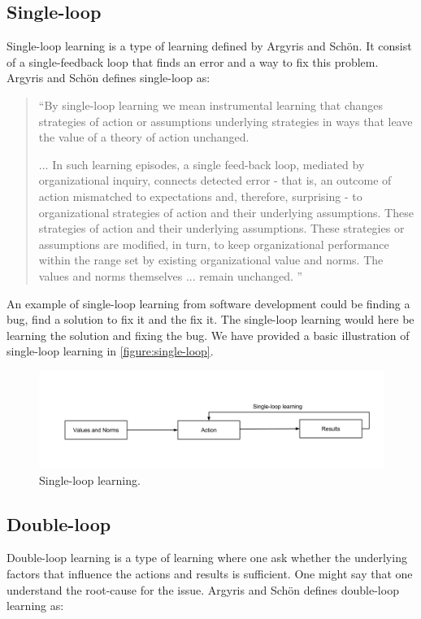 \subsection{Single-loop}
Single-loop learning is a type of learning defined by Argyris and Schön. It consist of a single-feedback loop that finds an error and a way to fix this problem. Argyris and Schön \cite{Argyris1996} defines single-loop as: 

\begin{quote}
``By single-loop learning we mean instrumental learning that changes strategies of action or assumptions underlying strategies in ways that leave the value of a theory of action unchanged.

... In such learning episodes, a single feed-back loop, mediated by organizational inquiry, connects detected error - that is, an outcome of action mismatched to expectations and, therefore, surprising - to organizational strategies of action and their underlying assumptions. These strategies of action and their underlying assumptions. These strategies or assumptions are modified, in turn, to keep organizational performance within the range set by existing organizational value and norms. The values and norms themselves ... remain unchanged. 
''
\end{quote}

An example of single-loop learning from software development could be finding a bug, find a solution to fix it and the fix it. The single-loop learning would here be learning the solution and fixing the bug. We have provided a basic illustration of single-loop learning in \autoref{figure:single-loop}.

\begin{figure}[!h]
	\centering
	\includegraphics[width=\textwidth, keepaspectratio]{figures/Single-loop.png}
	\caption{Single-loop learning.}
	\label{figure:single-loop}
\end{figure}

\subsection{Double-loop} %
\label{sub:double_loop}
Double-loop learning is a type of learning where one ask whether the underlying factors that influence the actions and results is sufficient.
One might say that one understand the root-cause for the issue. 
Argyris and Schön defines double-loop learning as: 


